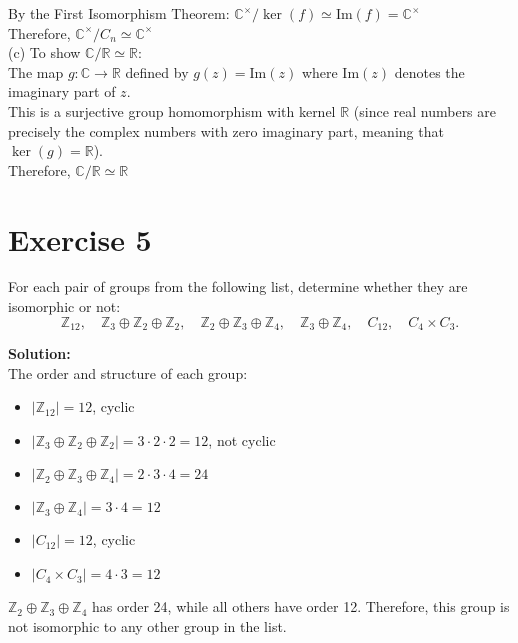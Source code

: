 \documentclass{article}
\begin{document}
By the First Isomorphism Theorem:
$\mathbb{C}^\times/\ker(f) \simeq \text{Im}(f) = \mathbb{C}^\times$ \\

Therefore, $\mathbb{C}^\times/C_n \simeq \mathbb{C}^\times$ \\

(c) To show $\mathbb{C}/\mathbb{R} \simeq \mathbb{R}$: \\

The map $g: \mathbb{C} \to \mathbb{R}$ defined by $g(z) = \text{Im}(z)$
where $\text{Im}(z)$ denotes the imaginary part of $z$. \\

This is a surjective group homomorphism with kernel $\mathbb{R}$
(since real numbers are precisely the complex numbers with zero imaginary part, meaning that $\ker(g) = \mathbb{R}$). \\

Therefore, $\mathbb{C}/\mathbb{R} \simeq \mathbb{R}$

\newpage

\section*{Exercise 5}
For each pair of groups from the following list, determine whether they are isomorphic or not:
\[ \mathbb{Z}_{12}, \quad \mathbb{Z}_3 \oplus \mathbb{Z}_2 \oplus \mathbb{Z}_2, \quad \mathbb{Z}_2 \oplus \mathbb{Z}_3 \oplus \mathbb{Z}_4, \quad \mathbb{Z}_3 \oplus \mathbb{Z}_4, \quad C_{12}, \quad C_4 \times C_3. \]

\textbf{Solution:} \\

The order and structure of each group:

   \begin{itemize}
   \item $|\mathbb{Z}_{12}| = 12$, cyclic
   \item $|\mathbb{Z}_3 \oplus \mathbb{Z}_2 \oplus \mathbb{Z}_2| = 3 \cdot 2 \cdot 2 = 12$, not cyclic
   \item $|\mathbb{Z}_2 \oplus \mathbb{Z}_3 \oplus \mathbb{Z}_4| = 2 \cdot 3 \cdot 4 = 24$
   \item $|\mathbb{Z}_3 \oplus \mathbb{Z}_4| = 3 \cdot 4 = 12$
   \item $|C_{12}| = 12$, cyclic
   \item $|C_4 \times C_3| = 4 \cdot 3 = 12$
   \end{itemize}

$\mathbb{Z}_2 \oplus \mathbb{Z}_3 \oplus \mathbb{Z}_4$ has order 24, while all others have order 12. Therefore, this group is not isomorphic to any other group in the list. \\
\end{document}
